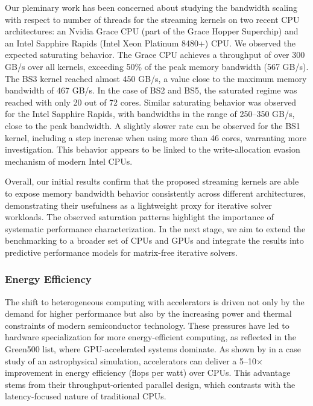 \documentclass[a4paper,12pt, numbers]{article}
\begin{document}
Our pleminary work has been concerned about studying the bandwidth scaling with respect to number of threads for the streaming kernels on two recent CPU architectures: an Nvidia Grace CPU (part of the Grace Hopper Superchip) and an Intel Sapphire Rapids (Intel Xeon Platinum 8480+) CPU. We observed the expected saturating behavior. The Grace CPU achieves a throughput of over 300 GB/s over all kernels, exceeding 50\% of the peak memory bandwidth (567 GB/s). The BS3 kernel reached almost 450 GB/s, a value close to the maximum memory bandwidth of 467 GB/s. In the case of BS2 and BS5, the saturated regime was reached with only 20 out of 72 cores. Similar saturating behavior was observed for the Intel Sapphire Rapids, with bandwidths in the range of 250--350 GB/s, close to the peak bandwidth. A slightly slower rate can be observed for the BS1 kernel, including a step increase when using more than 46 cores, warranting more investigation. This behavior appears to be linked to the write-allocation evasion mechanism of modern Intel CPUs.

Overall, our initial results confirm that the proposed streaming kernels are able to expose memory bandwidth behavior consistently across different architectures, demonstrating their usefulness as a lightweight proxy for iterative solver workloads.  The observed saturation patterns highlight the importance of systematic performance characterization. In the next stage, we aim to extend the benchmarking to a broader set of CPUs and GPUs and integrate the results into predictive performance models for matrix-free iterative solvers.



\subsubsection*{Energy Efficiency}

The shift to heterogeneous computing with accelerators is driven not only by the demand for higher performance but also by the increasing power and thermal constraints of modern semiconductor technology. These pressures have led to hardware specialization for more energy-efficient computing, as reflected in the Green500 list, where GPU-accelerated systems dominate. As shown by \cite{Cielo25} in a case study of an astrophysical simulation, accelerators can deliver a 5–10× improvement in energy efficiency (flops per watt) over CPUs. This advantage stems from their throughput-oriented parallel design, which contrasts with the latency-focused nature of traditional CPUs.
\end{document}
